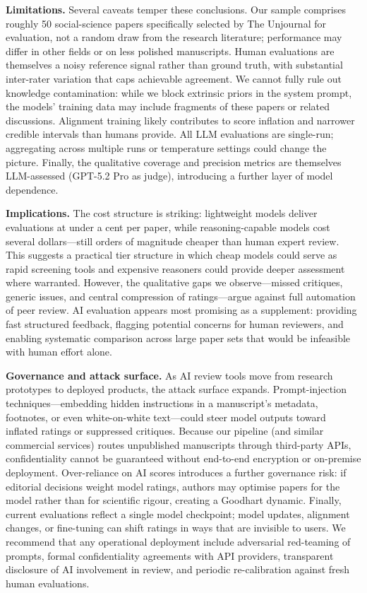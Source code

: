 \documentclass[
  11pt,
  letterpaper,
]{article}
\begin{document}
\textbf{Limitations.} Several caveats temper these conclusions. Our
sample comprises roughly 50 social-science papers specifically selected
by The Unjournal for evaluation, not a random draw from the research
literature; performance may differ in other fields or on less polished
manuscripts. Human evaluations are themselves a noisy reference signal
rather than ground truth, with substantial inter-rater variation that
caps achievable agreement. We cannot fully rule out knowledge
contamination: while we block extrinsic priors in the system prompt, the
models' training data may include fragments of these papers or related
discussions. Alignment training likely contributes to score inflation
and narrower credible intervals than humans provide. All LLM evaluations
are single-run; aggregating across multiple runs or temperature settings
could change the picture. Finally, the qualitative coverage and
precision metrics are themselves LLM-assessed (GPT-5.2 Pro as judge),
introducing a further layer of model dependence.

\textbf{Implications.} The cost structure is striking: lightweight
models deliver evaluations at under a cent per paper, while
reasoning-capable models cost several dollars---still orders of
magnitude cheaper than human expert review. This suggests a practical
tier structure in which cheap models could serve as rapid screening
tools and expensive reasoners could provide deeper assessment where
warranted. However, the qualitative gaps we observe---missed critiques,
generic issues, and central compression of ratings---argue against full
automation of peer review. AI evaluation appears most promising as a
supplement: providing fast structured feedback, flagging potential
concerns for human reviewers, and enabling systematic comparison across
large paper sets that would be infeasible with human effort alone.

\textbf{Governance and attack surface.} As AI review tools move from
research prototypes to deployed products, the attack surface expands.
Prompt-injection techniques---embedding hidden instructions in a
manuscript's metadata, footnotes, or even white-on-white text---could
steer model outputs toward inflated ratings or suppressed critiques.
Because our pipeline (and similar commercial services) routes
unpublished manuscripts through third-party APIs, confidentiality cannot
be guaranteed without end-to-end encryption or on-premise deployment.
Over-reliance on AI scores introduces a further governance risk: if
editorial decisions weight model ratings, authors may optimise papers
for the model rather than for scientific rigour, creating a Goodhart
dynamic. Finally, current evaluations reflect a single model checkpoint;
model updates, alignment changes, or fine-tuning can shift ratings in
ways that are invisible to users. We recommend that any operational
deployment include adversarial red-teaming of prompts, formal
confidentiality agreements with API providers, transparent disclosure of
AI involvement in review, and periodic re-calibration against fresh
human evaluations.
\end{document}
